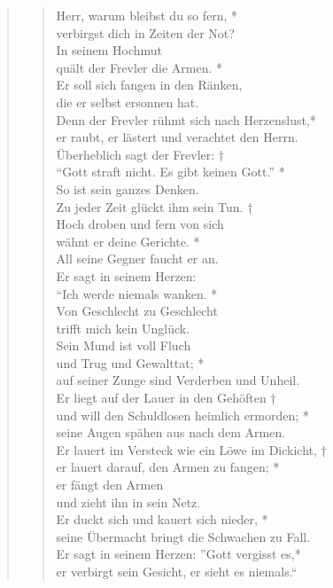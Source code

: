 \begin{quote}
\begin{verse}
Herr, warum bleibst du so fern, *\\
verbirgst dich in Zeiten der Not?\\
\vin In seinem Hochmut\\ 
\vin quält der Frevler die Armen. *\\
\vin Er soll sich fangen in den Ränken,\\ 
\vin die er selbst ersonnen hat.\\
Denn der Frevler rühmt sich nach Herzenslust,*\\
er raubt, er lästert und verachtet den Herrn.\\
\vin Überheblich sagt der Frevler: †\\
\vin ``Gott straft nicht. Es gibt keinen Gott.'' *\\
\vin So ist sein ganzes Denken.\\
Zu jeder Zeit glückt ihm sein Tun. †\\
Hoch droben und fern von sich\\
wähnt er deine Gerichte. *\\
All seine Gegner faucht er an. \\
\vin Er sagt in seinem Herzen:\\ 
\vin ``Ich werde niemals wanken. *\\
\vin Von Geschlecht zu Geschlecht\\
\vin trifft mich kein Unglück.\\
Sein Mund ist voll Fluch \\ 
und Trug und Gewalttat; *\\
auf seiner Zunge sind Verderben und Unheil.\\
\vin Er liegt auf der Lauer in den Gehöften †\\
\vin und will den Schuldlosen heimlich ermorden; *\\
\vin seine Augen spähen aus nach dem Armen.\\
Er lauert im Versteck wie ein Löwe im Dickicht, †\\
er lauert darauf, den Armen zu fangen; *\\
er fängt den Armen\\ 
und zieht ihn in sein Netz.\\
\vin Er duckt sich und kauert sich nieder, *\\
\vin seine Übermacht bringt die Schwachen zu Fall.\\
Er sagt in seinem Herzen: ''Gott vergisst es,*\\
er verbirgt sein Gesicht, er sieht es niemals.``\\



\end{verse}
\end{quote}
